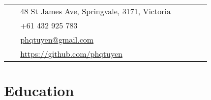 \documentclass[12pt]{article} %
\begin{document}
\begin{paracol}{2}
\parbox[top][0.12\textheight][c]{\linewidth}{ %
	\vspace{-0.04\textheight} %
	\colorbox{shade}{ %
		\begin{supertabular}{p{0.05\linewidth}|p{0.775\linewidth}} %
			\raisebox{-1pt}{\faHome} & 48 St James Ave, Springvale, 3171, Victoria \\ %
			\raisebox{-1pt}{\faPhone} & +61 432 925 783 \\ %
			\raisebox{0pt}{\small\faEnvelope} & \href{mailto:phqtuyen@gmail.com}{phqtuyen@gmail.com} \\ %
			\raisebox{-1pt}{\small\faDesktop} & \href{https://github.com/phqtuyen}{https://github.com/phqtuyen} \\ %
		\end{supertabular}
	}
}


\section{Education} 






\end{paracol}
\end{document}

